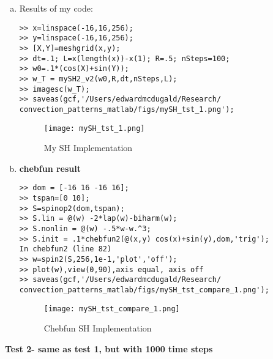 \documentclass[12pt]{article}
\begin{document}
\begin{enumerate}[(a)]
    \item Results of my code:
        \begin{verbatim}
>> x=linspace(-16,16,256);
>> y=linspace(-16,16,256);
>> [X,Y]=meshgrid(x,y);
>> dt=.1; L=x(length(x))-x(1); R=.5; nSteps=100;
>> w0=.1*(cos(X)+sin(Y));
>> w_T = mySH2_v2(w0,R,dt,nSteps,L);
>> imagesc(w_T);
>> saveas(gcf,'/Users/edwardmcdugald/Research/
convection_patterns_matlab/figs/mySH_tst_1.png');
        \end{verbatim}

    \begin{figure}[ht]
        \centering
        \texttt{[image: mySH\_tst\_1.png]}
        \caption{My SH Implementation}
    \end{figure}

\item \textbf{chebfun result}
    \begin{verbatim}
>> dom = [-16 16 -16 16];
>> tspan=[0 10];
>> S=spinop2(dom,tspan);
>> S.lin = @(w) -2*lap(w)-biharm(w);
>> S.nonlin = @(w) -.5*w-w.^3;
>> S.init = .1*chebfun2(@(x,y) cos(x)+sin(y),dom,'trig');
In chebfun2 (line 82) 
>> w=spin2(S,256,1e-1,'plot','off');
>> plot(w),view(0,90),axis equal, axis off
>> saveas(gcf,'/Users/edwardmcdugald/Research/
convection_patterns_matlab/figs/mySH_tst_compare_1.png');
    \end{verbatim}

     \begin{figure}[ht]
        \centering
        \texttt{[image: mySH\_tst\_compare\_1.png]}
        \caption{Chebfun SH Implementation}
    \end{figure}
\end{enumerate}

\textbf{Test 2- same as test 1, but with 1000 time steps}
\end{document}
